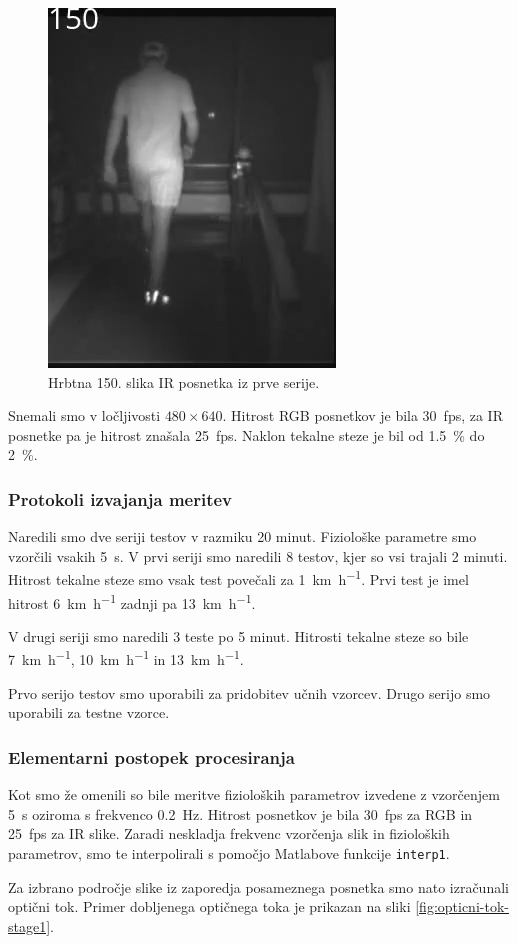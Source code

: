 \begin{figure}[htb]
	\centering
	\includegraphics[width=0.25\columnwidth]{./Slike/normal-ir-150.png}
	\caption{Hrbtna 150. slika IR posnetka iz prve serije.}
	\label{fig:primer-posnetka-ir}
\end{figure}

Snemali smo v ločljivosti $480 \times 640$. Hitrost RGB posnetkov je bila \SI{30}{fps}, za IR posnetke pa je hitrost znašala \SI{25}{fps}.  Naklon tekalne steze je bil od \SI{1.5}{\%} do \SI{2}{\%}.



\subsubsection{Protokoli izvajanja meritev}
Naredili smo dve seriji testov v razmiku 20 minut. Fiziološke parametre smo vzorčili vsakih \SI{5}{\s}. V prvi seriji smo naredili 8 testov, kjer so vsi trajali 2 minuti. Hitrost tekalne steze smo vsak test povečali za \SI{1}{\km\per\hour}. Prvi test je imel hitrost  \SI{6}{\km\per\hour} zadnji pa \SI{13}{\km\per\hour}.

V drugi seriji smo naredili 3 teste po 5 minut. Hitrosti tekalne steze so bile  \SI{7}{\km\per\hour}, \SI{10}{\km\per\hour} in \SI{13}{\km\per\hour}.

Prvo serijo testov smo uporabili za pridobitev učnih vzorcev. Drugo serijo smo uporabili za testne vzorce.


\subsubsection{Elementarni postopek procesiranja}\label{sec:elementarni-postopek}
Kot smo že omenili so bile meritve fizioloških parametrov izvedene z vzorčenjem \SI{5}{\s} oziroma s frekvenco \SI{0.2}{\hertz}. Hitrost posnetkov je bila \SI{30}{fps} za RGB in \SI{25}{fps} za IR slike. Zaradi neskladja frekvenc vzorčenja slik in fizioloških parametrov, smo te interpolirali s pomočjo Matlabove funkcije \texttt{interp1}.
 
Za izbrano področje slike iz zaporedja posameznega posnetka smo nato izračunali optični tok. Primer dobljenega optičnega toka je prikazan na sliki \ref{fig:opticni-tok-stage1}.


